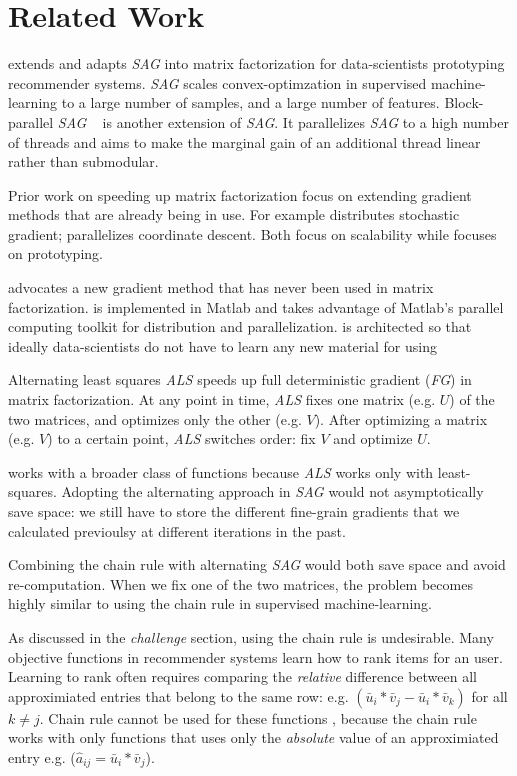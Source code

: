 \section{Related Work}
\tool extends and adapts \emph{SAG} into matrix factorization for data-scientists prototyping recommender systems.
\emph{SAG} \cite{schmidt2013minimizing, roux2012stochastic} scales convex-optimzation in supervised machine-learning to a large number of samples, and a large number of features.
Block-parallel \emph{SAG} ~\cite{bpsag} is another extension of \emph{SAG}.
It parallelizes \emph{SAG} to a high number of threads and aims to make the marginal gain of an additional thread linear rather than submodular.


Prior work on speeding up matrix factorization focus on extending gradient methods that are already being in use.
For example \cite{gemulla2011large} distributes stochastic gradient;
\cite{yu2012scalable} parallelizes coordinate descent.
Both focus on scalability while \tool focuses on prototyping.

\tool advocates a new gradient method that has never been used in matrix factorization.  
\tool is implemented in Matlab and takes advantage of Matlab's parallel computing toolkit for distribution and parallelization.
\tool is architected so that ideally data-scientists do not have to learn any new material for using \tool


Alternating least squares \emph{ALS} \cite{koren2009matrix, takacs2012alternating} speeds up full deterministic gradient (\emph{FG}) in matrix factorization.
At any point in time, \emph{ALS} fixes one matrix (e.g. $U$) of the two matrices, and optimizes only the other (e.g. $V$).
After optimizing a matrix (e.g. $V$) to a certain point, \emph{ALS} switches order: fix $V$ and optimize $U$.

\tool works with a broader class of functions because \emph{ALS} works only with least-squares.
Adopting the alternating approach in \emph{SAG} would not asymptotically save space:
we still have to store the different fine-grain gradients that we calculated previoulsy at different iterations in the past.

Combining the chain rule with alternating \emph{SAG} would both save space and avoid re-computation.
When we fix one of the two matrices, the problem becomes highly similar to using the chain rule in supervised machine-learning.  

As discussed in the \emph{challenge} section, using the chain rule is undesirable.
Many objective functions in recommender systems learn how to rank items for an user.
Learning to rank often requires comparing the \emph{relative} difference between all approximiated entries that belong to the same row:
e.g. $\left(\bar{u}_{i}*\bar{v}_{j} - \bar{u}_{i}*\bar{v}_{k}\right)$ for all $k \neq j$.
Chain rule cannot be used for these functions \cite{gapfm, climf, bpr, mnar, mmmf}, because 
the chain rule works with only functions that uses only the \emph{absolute} value of an approximiated entry e.g. ($\hat{a}_{ij} = \bar{u}_{i}*\bar{v}_{j}$).
